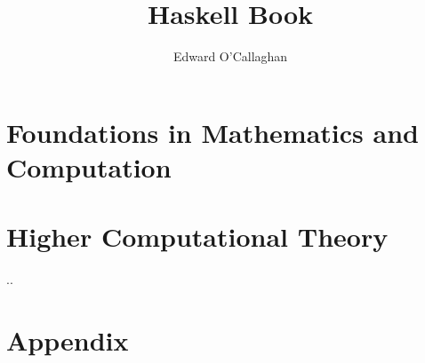 \documentclass{book}
\begin{document}
\title{Haskell Book}
\author{Edward O'Callaghan}

\frontmatter

\pagestyle{empty}



\hypertarget{preface}{}

\pagestyle{fancyplain}



\hypertarget{toc}{}

\setcounter{tocdepth}{1} %
\tableofcontents
\setcounter{tocdepth}{2} %

\mainmatter
\pagestyle{fancyplain}





\part{Foundations in Mathematics and Computation}
\label{part:foundationsinmathandcomp}









\part{Higher Computational Theory}
\label{part:highercomp}

..


\cleartooddpage[\thispagestyle{empty}] %
\part*{Appendix}

\appendix
\end{document}
